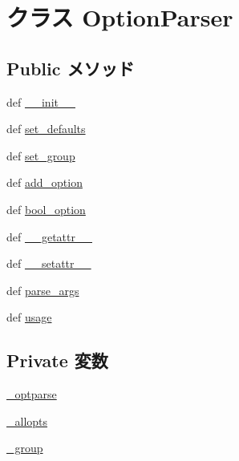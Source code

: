 \hypertarget{classm5_1_1options_1_1OptionParser}{
\section{クラス OptionParser}
\label{classm5_1_1options_1_1OptionParser}
}
\subsection*{Public メソッド}
\begin{DoxyCompactItemize}
\item 
def \hyperlink{classm5_1_1options_1_1OptionParser_ac775ee34451fdfa742b318538164070e}{\_\-\_\-init\_\-\_\-}
\item 
def \hyperlink{classm5_1_1options_1_1OptionParser_a7dc55681f5d3d244fc2bb24071cca393}{set\_\-defaults}
\item 
def \hyperlink{classm5_1_1options_1_1OptionParser_ab4033883235607d1e45958dbd9499355}{set\_\-group}
\item 
def \hyperlink{classm5_1_1options_1_1OptionParser_ad3eee4a96db4c61670bde07b2af08320}{add\_\-option}
\item 
def \hyperlink{classm5_1_1options_1_1OptionParser_aa2d1d05b008250ecf65db8a18be1c50b}{bool\_\-option}
\item 
def \hyperlink{classm5_1_1options_1_1OptionParser_a0a990b3ec3889d40889daca9ee5e4695}{\_\-\_\-getattr\_\-\_\-}
\item 
def \hyperlink{classm5_1_1options_1_1OptionParser_a6287b7a16286568d5442b6e2e90215b5}{\_\-\_\-setattr\_\-\_\-}
\item 
def \hyperlink{classm5_1_1options_1_1OptionParser_a4354871619b866b2d7855e024477196e}{parse\_\-args}
\item 
def \hyperlink{classm5_1_1options_1_1OptionParser_af67d40fcc793c85ca5ce6063d65256c1}{usage}
\end{DoxyCompactItemize}
\subsection*{Private 変数}
\begin{DoxyCompactItemize}
\item 
\hyperlink{classm5_1_1options_1_1OptionParser_a9812ba0c91f22625941890f9d0359bda}{\_\-optparse}
\item 
\hyperlink{classm5_1_1options_1_1OptionParser_afe19a94a7951361187bffb1971f5131a}{\_\-allopts}
\item 
\hyperlink{classm5_1_1options_1_1OptionParser_a0776d56d1b171a43be89478555bf783e}{\_\-group}
\end{DoxyCompactItemize}


